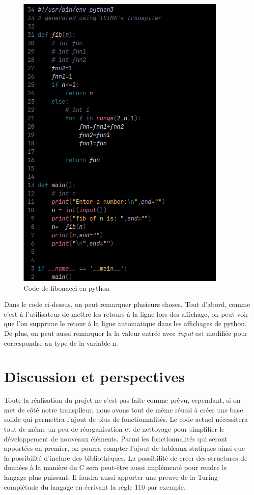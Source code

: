 \documentclass[a4paper]{article}%
\begin{document}
\begin{figure}[h]
  \begin{center}
  \includegraphics[scale=0.7]{./img/fib-prog-code.png}
  \caption{Code de fibonacci en python}
  \end{center}
\end{figure}

Dans le code ci-dessus, on peut remarquer plusieurs choses. Tout d'abord, comme
c'est à l'utilisateur de mettre les retours à la ligne lors des affichage, on
peut voir que l'on supprime le retour à la ligne automatique dans les affichages
de python. De plus, on peut aussi remarquer la la valeur entrée avec
\textit{input} est modifiée pour correspondre au type de la variable n.

\clearpage
\section{Discussion et perspectives}

Toute la réalisation du projet ne s'est pas faite comme prévu, cependant, si on
met de côté notre transpileur, nous avons tout de même réussi à créer une base
solide qui permettra l'ajout de plus de fonctionnalités. Le code actuel
nécessitera tout de même un peu de réorganisation et de nettoyage pour
simplifier le développement de nouveaux éléments. Parmi les fonctionnalités qui
seront apportées en premier, on pourra compter l'ajout de tableaux statiques
ainsi que la possibilité d'inclure des bibliothèques. La possibilité de créer
des structures de données à la manière du C sera peut-être aussi implémenté pour
rendre le langage plus puissant. Il faudra aussi apporter une preuve de la
Turing complétude du langage en écrivant la règle 110 par exemple.\\
\end{document}
